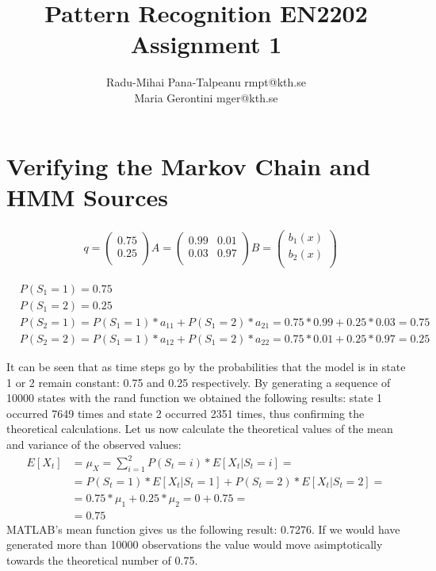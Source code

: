 \documentclass[a4paper, 10pt]{article}
\begin{document}
\title {Pattern Recognition EN2202 \\ Assignment 1}
\author{Radu-Mihai Pana-Talpeanu rmpt@kth.se \\Maria Gerontini mger@kth.se}
\maketitle

\section{Verifying the Markov Chain and HMM Sources}
\begin{align}
\nonumber
&q= \left( \begin{array}{c}
0.75 \\
0.25 \\ \end{array} \right) 
A= \left( \begin{array}{cc}
0.99 & 0.01\\
0.03 & 0.97 \\ \end{array} \right) 
B= \left( \begin{array}{c}
b_1(x)\\
b_2(x) \\ \end{array} \right)
\end{align}


\begin{align}
\nonumber &P(S_1=1)=0.75 \\
\nonumber &P(S_1=2)=0.25 \\
\nonumber &P(S_2=1)=P(S_1=1)*a_{11} + P(S_1=2)*a_{21} = 0.75*0.99 + 0.25*0.03 = 0.75 \\
\nonumber &P(S_2=2)=P(S_1=1)*a_{12} + P(S_1=2)*a_{22} = 0.75*0.01 + 0.25*0.97 = 0.25 
\end{align}

It can be seen that as time steps go by the probabilities that the model is in state 1 or 2 remain constant: 0.75 and 0.25 respectively.
By generating a sequence of 10000 states with the rand function we obtained the following results: state 1 occurred 7649 times and state 2 occurred 2351 times, thus confirming the theoretical calculations.
Let us now calculate the theoretical values of the mean and variance of the observed values:
\begin{align}
\nonumber E[X_t]&=\mu_X=\sum\limits_{i=1}^{2}P(S_t=i)*E[X_t|S_t=i]= \\
\nonumber &=P(S_t=1)*E[X_t|S_t=1]+P(S_t=2)*E[X_t|S_t=2] = \\
\nonumber &=0.75*\mu_1 + 0.25*\mu_2 = 0+0.75 = \\
\nonumber &=0.75
\end{align}
MATLAB's mean function gives us the following result: 0.7276. If we would have generated more than 10000 observations the value would move asimptotically towards the theoretical number of 0.75. 
\end{document}
